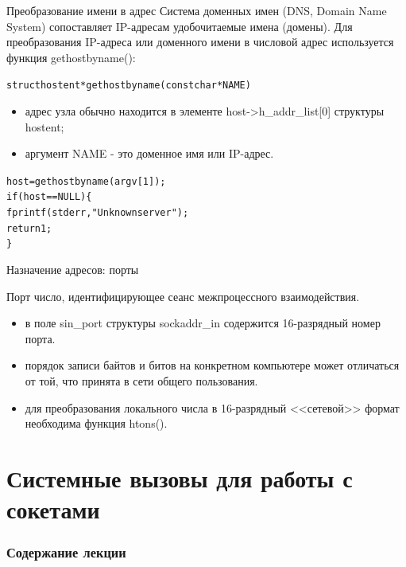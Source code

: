 \documentclass{beamer}
\begin{document}
\begin{frame}[fragile]{Преобразование имени в адрес}
Система доменных имен (DNS, Domain Name System) сопоставляет IP-адресам удобочитаемые имена (домены). Для преобразования IP-адреса или доменного имени в числовой адрес используется функция gethostbyname():
	\begin{alltt}
		struct hostent * gethostbyname (const char * NAME)
	\end{alltt}
	\begin{itemize}
		\item адрес узла обычно находится в элементе host->h\_addr\_list[0] структуры hostent;
		\item аргумент NAME - это доменное имя или IP-адрес.
	\end{itemize}
	\begin{alltt}
		host = gethostbyname (argv[1]);
		if (host == NULL) \{
		    fprintf (stderr, "Unknown server");
		    return 1;
		\}
	\end{alltt}	
\end{frame}

\begin{frame}[fragile]{Назначение адресов: порты}
	\begin{block}{Порт}
		число, идентифицирующее сеанс межпроцессного взаимодействия.
	\end{block}
	\begin{itemize}
		\item в поле sin\_port структуры sockaddr\_in содержится 16-разрядный номер порта.
		\item порядок записи байтов и битов на конкретном компьютере может отличаться от той, что принята в сети общего пользования. 
		\item для преобразования локального числа в 16-разрядный <<сетевой>> формат необходима функция htons().
	\end{itemize}
\end{frame}

\section{Системные вызовы для работы с сокетами}

\begin{frame}
  \frametitle{Содержание лекции}
  \tableofcontents[current]
\end{frame}
\end{document}
